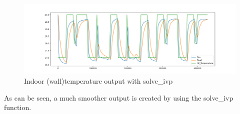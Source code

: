 \begin{figure}[ht]
	\centering
	\includegraphics[width=1\columnwidth]{Figures/solve_ivp_without_for_loop.png}
	\caption[Short title]{Indoor (wall)temperature output with \textsf{solve\_ivp}}
	\label{fig:profilelabels}
\end{figure}

As can be seen, a much smoother output is created by using the \textsf{solve\_ivp} function.








\newpage